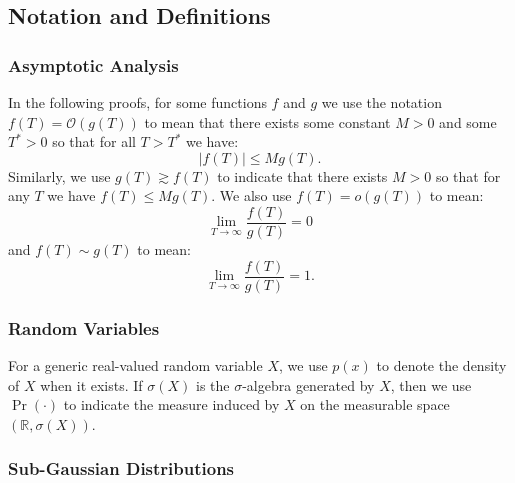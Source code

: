 \subsection{Notation and Definitions}
\label{app:notation}

\subsubsection{Asymptotic Analysis} 

In the following proofs, for some functions $f$ and $g$ we use the notation $f(T) = \mathcal{O}(g(T))$ to mean that there exists some constant $M > 0$ and some $T^* > 0$ so that for all $T > T^*$ we have: $$|f(T)| \leq M g(T).$$ Similarly, we use $g(T) \gtrsim f(T)$ to indicate that there exists $M > 0$ so that for any $T$ we have $f(T) \leq M g(T).$ We also use $f(T) = o(g(T))$ to mean:$$\lim_{T\to\infty} \frac{f(T)}{g(T)} = 0$$ and $f(T) \sim g(T)$ to mean: $$\lim_{T\to\infty} \frac{f(T)}{g(T)} = 1.$$ 

\subsubsection{Random Variables} 

For a generic real-valued random variable $X$, we use $p(x)$ to denote the density of $X$ when it exists. If $\sigma(X)$ is the $\sigma$-algebra generated by $X$, then we use $\Pr(\cdot)$ to indicate the measure induced by $X$ on the measurable space $(\mathbb{R},\sigma(X))$.

\subsubsection{Sub-Gaussian Distributions}

